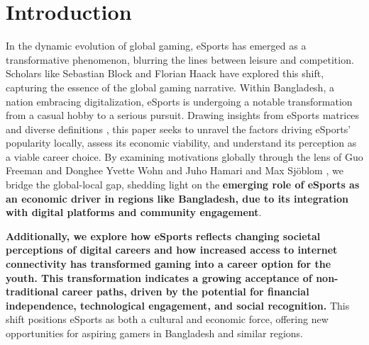 \documentclass[manuscript,screen,review,anonymous]{acmart}
\begin{document}
\section{Introduction}


In the dynamic evolution of global gaming, eSports has emerged as a transformative phenomenon, blurring the lines between leisure and competition. Scholars like Sebastian Block and Florian Haack \cite{a1} have explored this shift, capturing the essence of the global gaming narrative. Within Bangladesh, a nation embracing digitalization, eSports is undergoing a notable transformation from a casual hobby to a serious pursuit. Drawing insights from eSports matrices \cite{a2} and diverse definitions \cite{a3}, this paper seeks to unravel the factors driving eSports' popularity locally, assess its economic viability, and understand its perception as a viable career choice. By examining motivations globally through the lens of Guo Freeman and Donghee Yvette Wohn \cite{a3} and Juho Hamari and Max Sjöblom \cite{a4}, we bridge the global-local gap, shedding light on the \textbf{emerging role of eSports as an economic driver in regions like Bangladesh, due to its integration with digital platforms and community engagement}.

\textbf{Additionally, we explore how eSports reflects changing societal perceptions of digital careers and how increased access to internet connectivity has transformed gaming into a career option for the youth. This transformation indicates a growing acceptance of non-traditional career paths, driven by the potential for financial independence, technological engagement, and social recognition.} This shift positions eSports as both a cultural and economic force, offering new opportunities for aspiring gamers in Bangladesh and similar regions.
\end{document}

